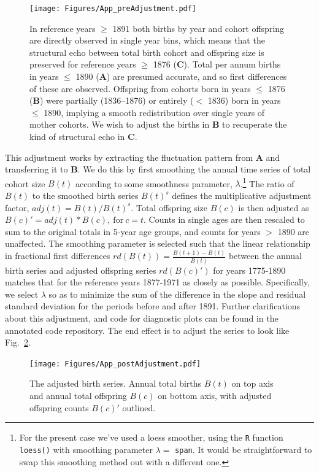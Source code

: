 \documentclass{article}
\begin{document}
\begin{appendix}
\begin{figure}[ht!]
\centering
 \texttt{[image: Figures/App\_preAdjustment.pdf]}
\caption{In reference years $\ge$ 1891 both births by year and cohort offspring are directly observed in single year bins, which means that the structural echo between total birth cohort and offspring size is preserved for reference years $\ge$ 1876  (\textbf{C}). Total per annum births in years $\le$ 1890 (\textbf{A}) are presumed accurate, and so first differences of these are observed. Offspring from cohorts born in years $\le$ 1876 (\textbf{B}) were partially (1836--1876) or entirely ($<$ 1836) born in years $\le$ 1890, implying a smooth redistribution over single years of mother cohorts. We wish to adjust the births in \textbf{B} to recuperate the kind of structural echo in \textbf{C}.}
\label{fig:toosmooth}
\end{figure}

This adjustment works by extracting the fluctuation pattern from \textbf{A} and transferring it to \textbf{B}. We do this by first smoothing the annual time series of total cohort size $B(t)$ according to some smoothness parameter, $\lambda$.\footnote{For the present case we've used a loess smoother, using the \texttt{R} function \texttt{loess()} with smoothing parameter $\lambda =$ \texttt{span}. It would be straightforward to swap this smoothing method out with a different one.} The ratio of $B(t)$ to the smoothed birth series $B(t)^s$ defines the multiplicative adjustment factor, $adj(t) = B(t)/B(t)^s$. Total offspring size $B(c)$ is then adjusted as $B(c)' = adj(t)*B(c), \mathrm{~for~} c = t$. Counts in single ages are then rescaled to sum to the original totals in 5-year age groups, and counts for years $>$ 1890 are unaffected. The smoothing parameter is selected such that the linear relationship in fractional first differences $rd(B(t)) = \frac{B(t+1)-B(t)}{B(t)}$ between the annual birth series and adjusted offspring series $rd(B(c)')$ for years 1775-1890 matches that for the reference years 1877-1971 as closely as possible. Specifically, we select $\lambda$ so as to minimize the sum of the difference in the slope and residual standard deviation for the periods before and after 1891. Further clarifications about this adjustment, and code for diagnostic plots can be found in the annotated code repository. The end effect is to adjust the series to look like Fig.~\ref{fig:better}.

\begin{figure}[ht!]
\centering
 \texttt{[image: Figures/App\_postAdjustment.pdf]}
\caption{The adjusted birth series. Annual total births $B(t)$ on top axis and annual total offspring $B(c)$ on bottom axis, with adjusted offspring counts $B(c)'$ outlined.}
\label{fig:better}
\end{figure}
\end{appendix}
\end{document}

